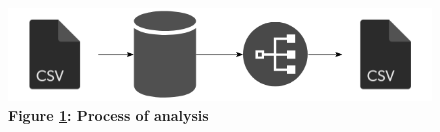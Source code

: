 \begin{figure}[H]
    \centering
    \begin{mdframed}
        \centering
        \includegraphics[scale=0.35]{./resources/figures/analysis.png}
    \end{mdframed}
    \caption[Analysis Workflow]{\textbf{Figure \ref{fig-analysis-workflow}: Process of analysis}}
    \label{fig-analysis-workflow}
\end{figure}

